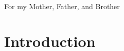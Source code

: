 \documentclass[fullpage, UKenglish]{uiucthesis2009}
\begin{document}

\begin{dedication}
For my Mother, Father, and Brother
\end{dedication}


%


%
%
%
\tableofcontents
%
%
%
%

\mainmatter

\chapter{Introduction}
\label{sec:intro}

\end{document}
